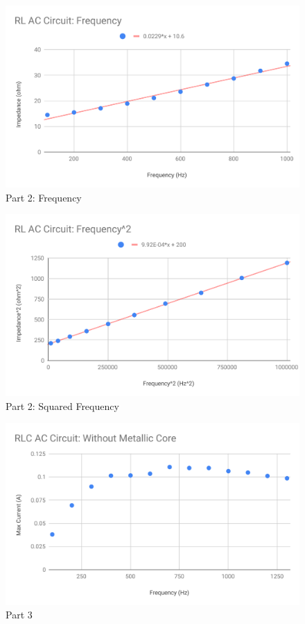 %
\begin{figure}[ht]
	\centering
	\includegraphics[scale=0.74]{image/06-RLC/part-2-f.pdf}
	\caption{Part 2: Frequency}
	\label{figure.06.part.2.f}
\end{figure}
%
\begin{figure}[ht]
	\centering
	\includegraphics[scale=0.74]{image/06-RLC/part-2-f2.pdf}
	\caption{Part 2: Squared Frequency}
	\label{figure.06.part.2.f2}
\end{figure}
%
\begin{figure}[ht]
	\centering
	\includegraphics[scale=0.74]{image/06-RLC/part-3.pdf}
	\caption{Part 3}
	\label{figure.06.part.3.f}
\end{figure}
